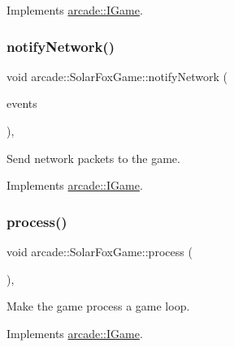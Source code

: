 Implements \hyperlink{classarcade_1_1_i_game_a37d164b4052fa3c28256fb0bf0002876}{arcade\+::\+I\+Game}.

\mbox{\label{classarcade_1_1_solar_fox_game_ada83eb3dae2a14130fca4376f9274e5a}} 
\subsubsection{\texorpdfstring{notify\+Network()}{notifyNetwork()}}
{\footnotesize\ttfamily void arcade\+::\+Solar\+Fox\+Game\+::notify\+Network (\begin{DoxyParamCaption}\item[{std\+::vector$<$ \hyperlink{structarcade_1_1_network_packet}{Network\+Packet} $>$ \&\&}]{events }\end{DoxyParamCaption})\hspace{0.3cm}{\ttfamily [override]}, {\ttfamily [virtual]}}



Send network packets to the game. 



Implements \hyperlink{classarcade_1_1_i_game_aaf375290947abf3db32d966facbfacf3}{arcade\+::\+I\+Game}.

\mbox{\label{classarcade_1_1_solar_fox_game_a12ff0eeb750910455e2dcc1954cdac86}} 
\subsubsection{\texorpdfstring{process()}{process()}}
{\footnotesize\ttfamily void arcade\+::\+Solar\+Fox\+Game\+::process (\begin{DoxyParamCaption}{ }\end{DoxyParamCaption})\hspace{0.3cm}{\ttfamily [override]}, {\ttfamily [virtual]}}



Make the game process a game loop. 



Implements \hyperlink{classarcade_1_1_i_game_af0111a41083f38a1af1a7f94287e6e77}{arcade\+::\+I\+Game}.

